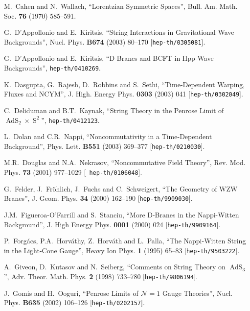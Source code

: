 \documentclass[11pt,a4paper]{article}
\DeclareMathOperator{\AdS}{AdS}
\DeclareMathOperator{\Sphere}{S}
\let\S\Sphere
\begin{document}
\begin{thebibliography}{99}
 M.~Cahen and N.~Wallach, ``Lorentzian Symmetric
  Spaces'', Bull. Am. Math. Soc. {\bf 76} (1970) 585--591.

 G.~D'Appollonio and E.~Kiritsis, ``String Interactions
  in Gravitational Wave Backgrounds'', Nucl. Phys. {\bf B674} (2003)
  80--170 [{\tt hep-th/0305081}].

 G.~D'Appollonio and E.~Kiritsis, ``D-Branes and BCFT in
  Hpp-Wave Backgrounds'', {\tt hep-th/0410269}.

 K.~Dasgupta, G.~Rajesh, D.~Robbins and S.~Sethi,
  ``Time-Dependent Warping, Fluxes and NCYM'', J. High. Energy
  Phys. {\bf 0303} (2003) 041 [{\tt hep-th/0302049}].

 C.~Deliduman and B.T.~Kaynak, ``String Theory in the
  Penrose Limit of $\AdS_2\times\S^2$'', {\tt hep-th/0412123}.

 L.~Dolan and C.R.~Nappi, ``Noncommutativity in a
  Time-Dependent Background'', Phys. Lett. {\bf B551} (2003) 369--377
  [{\tt hep-th/0210030}].

 M.R.~Douglas and N.A.~Nekrasov, ``Noncommutative Field
  Theory'', Rev. Mod. Phys. {\bf 73} (2001) 977--1029 [{\tt
    hep-th/0106048}].

 G.~Felder, J.~Fr\"ohlich, J.~Fuchs and C.~Schweigert,
  ``The Geometry of WZW Branes'', J. Geom. Phys. {\bf 34} (2000)
  162--190 [{\tt hep-th/9909030}].

 J.M.~Figueroa-O'Farrill and S.~Stanciu, ``More D-Branes
  in the Nappi-Witten Background'', J. High Energy Phys. {\bf 0001}
  (2000) 024 [{\tt hep-th/9909164}].

 P.~Forg\'acs, P.A.~Horv\'athy, Z.~Horv\'ath and L.~Palla,
  ``The Nappi-Witten String in the Light-Cone Gauge'', Heavy Ion
  Phys. {\bf 1} (1995) 65--83 [{\tt hep-th/9503222}].

 A.~Giveon, D.~Kutasov and N.~Seiberg, ``Comments on
  String Theory on $\AdS_3$'', Adv. Theor. Math. Phys. {\bf 2} (1998)
  733--780 [{\tt hep-th/9806194}].

 J.~Gomis and H.~Ooguri, ``Penrose Limits of
  $\mathcal{N}=1$ Gauge Theories'', Nucl. Phys. {\bf B635} (2002)
  106--126 [{\tt hep-th/0202157}].


\end{thebibliography}
\end{document}
